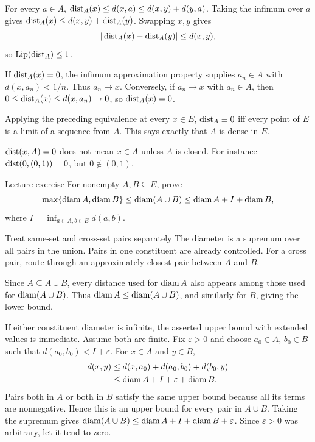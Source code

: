 \begin{answer}
For every $a\in A$, $\operatorname{dist}_A(x)\le d(x,a)\le d(x,y)+d(y,a)$. Taking the infimum over $a$ gives $\operatorname{dist}_A(x)\le d(x,y)+\operatorname{dist}_A(y)$. Swapping $x,y$ gives
\[|\operatorname{dist}_A(x)-\operatorname{dist}_A(y)|\le d(x,y),\]
so $\operatorname{Lip}(\operatorname{dist}_A)\le1$.

If $\operatorname{dist}_A(x)=0$, the infimum approximation property supplies $a_n\in A$ with $d(x,a_n)<1/n$. Thus $a_n\to x$. Conversely, if $a_n\to x$ with $a_n\in A$, then $0\le\operatorname{dist}_A(x)\le d(x,a_n)\to0$, so $\operatorname{dist}_A(x)=0$.

Applying the preceding equivalence at every $x\in E$, $\operatorname{dist}_A\equiv0$ iff every point of $E$ is a limit of a sequence from $A$. This says exactly that $A$ is dense in $E$.
\end{answer}
\begin{tip}
$\operatorname{dist}(x,A)=0$ does not mean $x\in A$ unless $A$ is closed. For instance $\operatorname{dist}(0,(0,1))=0$, but $0\notin(0,1)$.
\end{tip}
\begin{exam}{Lecture exercise}
For nonempty $A,B\subseteq E$, prove
\[\max\{\operatorname{diam} A,\operatorname{diam} B\}\le\operatorname{diam}(A\cup B)\le\operatorname{diam} A+I+\operatorname{diam} B,\]
where $I=\inf_{a\in A,b\in B}d(a,b)$.
\end{exam}
\begin{method}{Treat same-set and cross-set pairs separately}
The diameter is a supremum over all pairs in the union. Pairs in one constituent are already controlled. For a cross pair, route through an approximately closest pair between $A$ and $B$.
\end{method}
\begin{answer}
Since $A\subseteq A\cup B$, every distance used for $\operatorname{diam} A$ also appears among those used for $\operatorname{diam}(A\cup B)$. Thus $\operatorname{diam} A\le\operatorname{diam}(A\cup B)$, and similarly for $B$, giving the lower bound.

If either constituent diameter is infinite, the asserted upper bound with extended values is immediate. Assume both are finite. Fix $\varepsilon>0$ and choose $a_0\in A$, $b_0\in B$ such that $d(a_0,b_0)<I+\varepsilon$. For $x\in A$ and $y\in B$,
\begin{align*}
d(x,y)&\le d(x,a_0)+d(a_0,b_0)+d(b_0,y)\\
&\le\operatorname{diam} A+I+\varepsilon+\operatorname{diam} B.
\end{align*}
Pairs both in $A$ or both in $B$ satisfy the same upper bound because all its terms are nonnegative. Hence this is an upper bound for every pair in $A\cup B$. Taking the supremum gives $\operatorname{diam}(A\cup B)\le\operatorname{diam} A+I+\operatorname{diam} B+\varepsilon$. Since $\varepsilon>0$ was arbitrary, let it tend to zero.
\end{answer}
